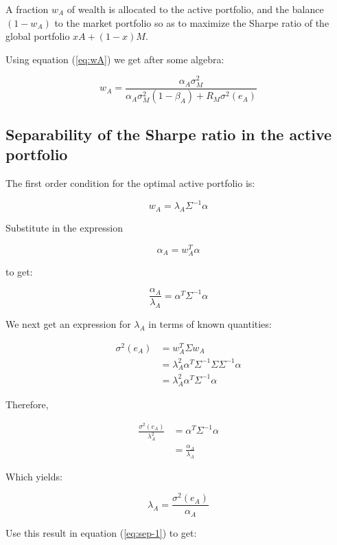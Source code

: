 \documentclass[
  11pt,
]{article}
\begin{document}
A fraction \(w_A\) of wealth is allocated to the active portfolio, and
the balance \((1-w_A)\) to the market portfolio so as to maximize the
Sharpe ratio of the global portfolio \(xA + (1-x)M\).

Using equation (\ref{eq:wA}) we get after some algebra:

\[
w_A = \frac{\alpha_A \sigma^2_M}{\alpha_A \sigma^2_M(1-\beta_A) + R_M \sigma^2(e_A)}
\]

\hypertarget{separability-of-the-sharpe-ratio-in-the-active-portfolio}{%
\subsection{Separability of the Sharpe ratio in the active
portfolio}\label{separability-of-the-sharpe-ratio-in-the-active-portfolio}}

The first order condition for the optimal active portfolio is:

\begin{equation}
w_A = \lambda_A \Sigma^{-1} \alpha
\label{eq:FOC-1}
\end{equation}

Substitute in the expression

\[
\alpha_A = w^T_A \alpha
\]

to get:

\begin{equation}
\frac{\alpha_A}{\lambda_A} = \alpha^T \Sigma^{-1} \alpha
\label{eq:sep-1}
\end{equation}

We next get an expression for \(\lambda_A\) in terms of known
quantities:

\begin{align*}
\sigma^2(e_A) &= w^T_A \Sigma w_A \\
&= \lambda^2_A \alpha^T \Sigma^{-1}\Sigma\Sigma^{-1} \alpha \\
&= \lambda^2_A \alpha^T \Sigma^{-1} \alpha
\end{align*}

Therefore,

\begin{align*}
\frac{\sigma^2(e_A)}{\lambda^2_A} &= \alpha^T \Sigma^{-1} \alpha \\
&= \frac{\alpha_A}{\lambda_A}
\end{align*}

Which yields:

\[
\lambda_A = \frac{\sigma^2(e_A)}{\alpha_A}
\]

Use this result in equation (\ref{eq:sep-1}) to get:
\end{document}
